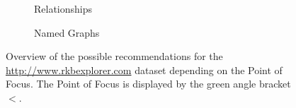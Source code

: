 \begin{figure}
\begin{subfigure}[b]{.475\textwidth}
		\caption{Relationships}
		\label{fig:rkb-recommendations-relations}
	\end{subfigure}
	\begin{subfigure}[b]{.475\textwidth}
		\caption{Named Graphs}
		\label{fig:rkb-recommendations-graph}
	\end{subfigure}
	\caption[Overview of possible recommendations in SPARQLed]{Overview of the possible recommendations for the \url{http://www.rkbexplorer.com} dataset depending on the Point of Focus. The Point of Focus is displayed by the green angle bracket $<$.}
	\label{fig:rkb-recommendations}
\end{figure}

